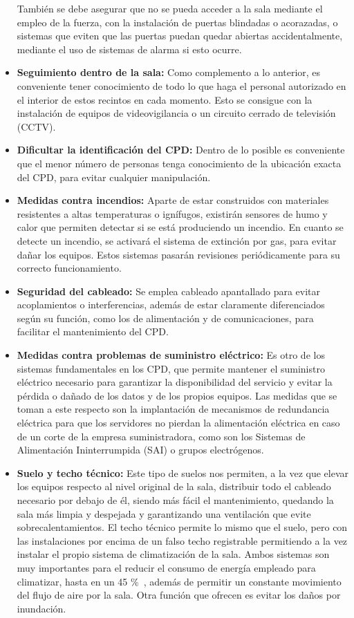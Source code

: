 \begin{itemize}
	También se debe asegurar que no se pueda acceder a la sala mediante el empleo de la fuerza, con la instalación de puertas blindadas o acorazadas, o sistemas que eviten que las puertas puedan quedar abiertas accidentalmente, mediante el uso de sistemas de alarma si esto ocurre.
	\item \textbf{Seguimiento dentro de la sala:} Como complemento a lo anterior, es conveniente tener conocimiento de todo lo que haga el personal autorizado en el interior de estos recintos en cada momento. Esto se consigue con la instalación de equipos de videovigilancia o un circuito cerrado de televisión (CCTV).
	\item \textbf{Dificultar la identificación del CPD:} Dentro de lo posible es conveniente que el menor número de personas tenga conocimiento de la ubicación exacta del CPD, para evitar cualquier manipulación.
	\item \textbf{Medidas contra incendios:} Aparte de estar construidos con materiales resistentes a altas temperaturas o ignífugos, existirán sensores de humo y calor que permiten detectar si se está produciendo un incendio. En cuanto se detecte un incendio, se activará el sistema de extinción por gas, para evitar dañar los equipos. Estos sistemas pasarán revisiones periódicamente para su correcto funcionamiento.
	\item \textbf{Seguridad del cableado:} Se emplea cableado apantallado para evitar acoplamientos o interferencias, además de estar claramente diferenciados según su función, como los de alimentación y de comunicaciones, para facilitar el mantenimiento del CPD\@.
	\item \textbf{Medidas contra problemas de suministro eléctrico:} Es otro de los sistemas fundamentales en los CPD, que permite mantener el suministro eléctrico necesario para garantizar la disponibilidad del servicio y evitar la pérdida o dañado de los datos y de los propios equipos. Las medidas que se toman a este respecto son la implantación de mecanismos de redundancia eléctrica para que los servidores no pierdan la alimentación eléctrica en caso de un corte de la empresa suministradora, como son los Sistemas de Alimentación Ininterrumpida (SAI) o grupos electrógenos.
	\item \textbf{Suelo y techo técnico:} Este tipo de suelos nos permiten, a la vez que elevar los equipos respecto al nivel original de la sala, distribuir todo el cableado necesario por debajo de él, siendo más fácil el mantenimiento, quedando la sala más limpia y despejada y garantizando una ventilación que evite sobrecalentamientos. El techo técnico permite lo mismo que el suelo, pero con las instalaciones por encima de un falso techo registrable permitiendo a la vez instalar el propio sistema de climatización de la sala. Ambos sistemas son muy importantes para el reducir el consumo de energía empleado para climatizar, hasta en un 45 \%~\cite{polygroup_suelo_2020}, además de permitir un constante movimiento del flujo de aire por la sala. Otra función que ofrecen es evitar los daños por inundación.

\end{itemize}
